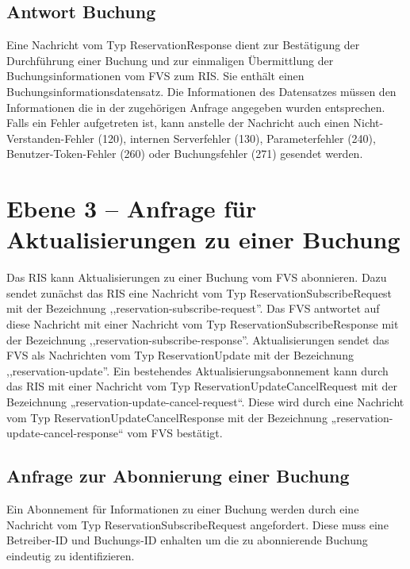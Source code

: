 

\subsection{Antwort Buchung}
Eine Nachricht vom Typ ReservationResponse dient zur Bestätigung der Durchführung einer Buchung und zur einmaligen Übermittlung der Buchungsinformationen vom FVS zum RIS. Sie enthält einen Buchungsinformationsdatensatz. Die Informationen des Datensatzes müssen den Informationen die in der zugehörigen Anfrage angegeben wurden entsprechen. Falls ein Fehler aufgetreten ist, kann anstelle der Nachricht auch einen Nicht-Verstanden-Fehler (120), internen Serverfehler (130), Parameterfehler (240), Benutzer-Token-Fehler (260) oder Buchungsfehler (271) gesendet werden.




\section{Ebene 3 -- Anfrage für Aktualisierungen zu einer Buchung}
Das RIS kann Aktualisierungen zu einer Buchung vom FVS abonnieren. Dazu sendet zunächst das RIS eine Nachricht vom Typ ReservationSubscribeRequest mit der Bezeichnung ,,reservation-subscribe-request''. Das FVS antwortet auf diese Nachricht mit einer Nachricht vom Typ ReservationSubscribeResponse mit der Bezeichnung ,,reservation-subscribe-response''. Aktualisierungen sendet das FVS als Nachrichten vom Typ ReservationUpdate mit der Bezeichnung ,,reservation-update''. Ein bestehendes Aktualisierungsabonnement kann durch das RIS mit einer Nachricht vom Typ ReservationUpdateCancelRequest mit der Bezeichnung „reservation-update-cancel-request“. Diese wird durch eine Nachricht vom Typ ReservationUpdateCancelResponse mit der Bezeichnung „reservation-update-cancel-response“ vom FVS bestätigt.



\subsection{Anfrage zur Abonnierung einer Buchung}
Ein Abonnement für Informationen zu einer Buchung werden durch eine Nachricht vom Typ ReservationSubscribeRequest angefordert. Diese muss eine Betreiber-ID und Buchungs-ID enhalten um die zu abonnierende Buchung eindeutig zu identifizieren.

